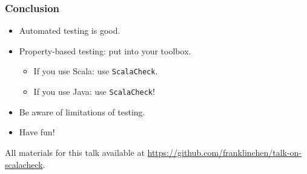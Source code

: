 \begin{frame}
  \frametitle{Conclusion}

  \begin{itemize}
    \item Automated testing is good.
    \item Property-based testing: put into your toolbox.
      \begin{itemize}
        \item If you use Scala: use \texttt{ScalaCheck}.
        \item If you use Java: use \texttt{ScalaCheck}!
      \end{itemize}
    \item Be aware of limitations of testing.
    \item Have fun!
  \end{itemize}

  All materials for this talk available at \url{https://github.com/franklinchen/talk-on-scalacheck}.

\end{frame}



